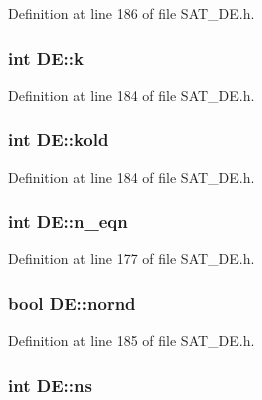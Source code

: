 Definition at line 186 of file S\-A\-T\-\_\-\-D\-E.\-h.

\hypertarget{classDE_a583b51553ddbe1eb995e76d42b2e13ec}{
\subsubsection[{k}]{\setlength{\rightskip}{0pt plus 5cm}int D\-E\-::k\hspace{0.3cm}{\ttfamily [private]}}}\label{classDE_a583b51553ddbe1eb995e76d42b2e13ec}


Definition at line 184 of file S\-A\-T\-\_\-\-D\-E.\-h.

\hypertarget{classDE_aaa4409f0e1999d15aa33da045dcf464d}{
\subsubsection[{kold}]{\setlength{\rightskip}{0pt plus 5cm}int D\-E\-::kold\hspace{0.3cm}{\ttfamily [private]}}}\label{classDE_aaa4409f0e1999d15aa33da045dcf464d}


Definition at line 184 of file S\-A\-T\-\_\-\-D\-E.\-h.

\hypertarget{classDE_ae74a30c7f5448d96d8460b4fde65f849}{
\subsubsection[{n\-\_\-eqn}]{\setlength{\rightskip}{0pt plus 5cm}int D\-E\-::n\-\_\-eqn\hspace{0.3cm}{\ttfamily [private]}}}\label{classDE_ae74a30c7f5448d96d8460b4fde65f849}


Definition at line 177 of file S\-A\-T\-\_\-\-D\-E.\-h.

\hypertarget{classDE_ab7d114c0f93009e0deddea4375764e52}{
\subsubsection[{nornd}]{\setlength{\rightskip}{0pt plus 5cm}bool D\-E\-::nornd\hspace{0.3cm}{\ttfamily [private]}}}\label{classDE_ab7d114c0f93009e0deddea4375764e52}


Definition at line 185 of file S\-A\-T\-\_\-\-D\-E.\-h.

\hypertarget{classDE_a4d82322b4499d5f8e27f2e19675fcfa6}{
\subsubsection[{ns}]{\setlength{\rightskip}{0pt plus 5cm}int D\-E\-::ns\hspace{0.3cm}{\ttfamily [private]}}}\label{classDE_a4d82322b4499d5f8e27f2e19675fcfa6}


